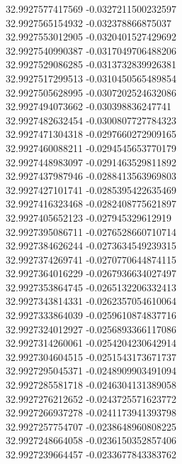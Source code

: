 {32.9927577417569	-0.0327211500232597\\
32.9927565154932	-0.032378866875037\\
32.9927553012905	-0.0320401527429692\\
32.9927540990387	-0.0317049706488206\\
32.9927529086285	-0.0313732839926381\\
32.9927517299513	-0.0310450565489854\\
32.9927505628995	-0.0307202524632086\\
32.9927494073662	-0.030398836247741\\
32.9927482632454	-0.0300807727784323\\
32.9927471304318	-0.0297660272909165\\
32.9927460088211	-0.0294545653770179\\
32.9927448983097	-0.0291463529811892\\
32.9927437987946	-0.0288413563969803\\
32.9927427101741	-0.0285395422635469\\
32.9927416323468	-0.0282408775621897\\
32.9927405652123	-0.027945329612919\\
32.9927395086711	-0.0276528660710714\\
32.9927384626244	-0.0273634549239315\\
32.9927374269741	-0.0270770644874115\\
32.9927364016229	-0.0267936634027497\\
32.9927353864745	-0.0265132206332413\\
32.9927343814331	-0.0262357054610064\\
32.9927333864039	-0.0259610874837716\\
32.9927324012927	-0.0256893366117086\\
32.9927314260061	-0.0254204230642914\\
32.9927304604515	-0.0251543173671737\\
32.9927295045371	-0.0248909903491094\\
32.9927285581718	-0.0246304131389058\\
32.9927276212652	-0.0243725571623772\\
32.9927266937278	-0.0241173941393798\\
32.9927257754707	-0.0238648960808225\\
32.9927248664058	-0.0236150352857406\\
32.9927239664457	-0.0233677843383762\\
}
